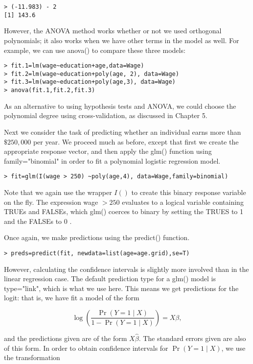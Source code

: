 \documentclass[10pt]{article}
\begin{document}
\begin{verbatim}
> (-11.983) - 2
[1] 143.6
\end{verbatim}

However, the ANOVA method works whether or not we used orthogonal polynomials; it also works when we have other terms in the model as well. For example, we can use anova() to compare these three models:

\begin{verbatim}
> fit.1=lm(wage~education+age,data=Wage)
> fit.2=lm(wage~education+poly(age, 2), data=Wage)
> fit.3=lm(wage~education+poly(age,3), data=Wage)
> anova(fit.1,fit.2,fit.3)
\end{verbatim}

As an alternative to using hypothesis tests and ANOVA, we could choose the polynomial degree using cross-validation, as discussed in Chapter 5.

Next we consider the task of predicting whether an individual earns more than $\$ 250,000$ per year. We proceed much as before, except that first we create the appropriate response vector, and then apply the glm() function using family="binomial" in order to fit a polynomial logistic regression model.

\begin{verbatim}
> fit=glm(I(wage > 250) ~poly(age,4), data=Wage,family=binomial)
\end{verbatim}

Note that we again use the wrapper $I()$ to create this binary response variable on the fly. The expression wage $>250$ evaluates to a logical variable containing TRUEs and FALSEs, which glm() coerces to binary by setting the TRUES to 1 and the FALSEs to 0 .

Once again, we make predictions using the predict() function.

\begin{verbatim}
> preds=predict(fit, newdata=list(age=age.grid),se=T)
\end{verbatim}

However, calculating the confidence intervals is slightly more involved than in the linear regression case. The default prediction type for a glm() model is type="link", which is what we use here. This means we get predictions for the logit: that is, we have fit a model of the form

$$
\log \left(\frac{\operatorname{Pr}(Y=1 \mid X)}{1-\operatorname{Pr}(Y=1 \mid X)}\right)=X \beta,
$$

and the predictions given are of the form $X \hat{\beta}$. The standard errors given are also of this form. In order to obtain confidence intervals for $\operatorname{Pr}(Y=1 \mid X)$, we use the transformation
\end{document}

